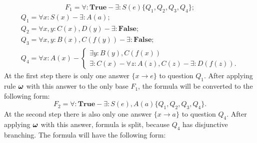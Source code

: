 \documentclass[runningheads,a4paper]{llncs}
\begin{document}



\begin{example}\label{proofexample}


\begin{equation*}\label{ex:f1}
  F_1 = \forall\colon\boldsymbol{True} - \exists\colon S(e)\{Q_1,Q_2,Q_3,Q_4\};
\end{equation*}
\begin{equation*}
  \begin{array}{l}
  Q_1 = \forall x\colon S(x) - \exists\colon A(a); \\
  Q_2 = \forall x,y\colon C(x),D(y) - \exists\colon\boldsymbol{False}; \\
  Q_3 = \forall x,y\colon B(x),C(f(y)) - \exists\colon\boldsymbol{False}; \\
  Q_4 =
  \forall x\colon A(x) -
  \left\lbrace
  \begin{array}{l}
    \exists y\colon B(y),C(f(x)) \\
    \exists \colon C(x) - \forall z\colon A(z),C(z) - \exists\colon D(f(z)).
  \end{array}\right.
  \end{array}
\end{equation*}
At the first step there is only one answer $\{x \rightarrow e\}$ to question $Q_1$. After applying rule $\boldsymbol{\omega}$ with this answer to the only base $F_1$, the formula will be converted to the following form:
\begin{equation*}\label{ex:f2}
  F_2 = \forall\colon\boldsymbol{True} - \exists\colon S(e),A(a)\{Q_1,Q_2,Q_3,Q_4\}.
\end{equation*}
At the second step there is also only one answer $\{x \rightarrow a\}$ to question $Q_4$. After applying $\boldsymbol{\omega}$ with this answer, formula is split, because $Q_4$ has disjunctive branching. The formula will have the following form:


\end{example}
\end{document}
